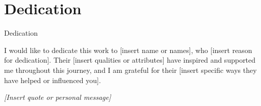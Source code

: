 \chapter*{Dedication}
\begin{center}
\Large Dedication
\end{center}

\vspace{1cm}

\begin{flushright}
\begin{minipage}{0.6\textwidth}
I would like to dedicate this work to [insert name or names], who [insert reason for dedication]. Their [insert qualities or attributes] have inspired and supported me throughout this journey, and I am grateful for their [insert specific ways they have helped or influenced you].

\end{minipage}
\end{flushright}

\vspace{2cm}

\begin{center}
\textit{[Insert quote or personal message]}
\end{center}

\vspace{2cm}

\begin{flushright}
\end{flushright}